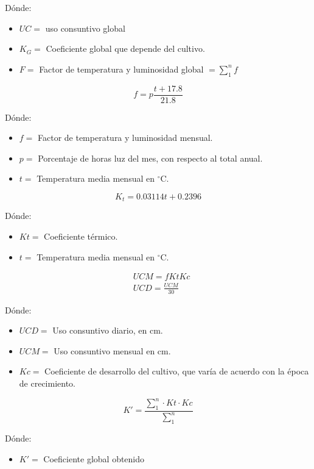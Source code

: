 Dónde:
\begin{itemize}
	\item $UC =$ uso consuntivo global
	\item $K_G =$ Coeficiente global que depende del cultivo.
	\item $F=$ Factor de temperatura y luminosidad global $=\sum_1^n f$
\end{itemize}

\begin{equation}
	f=p\frac{t+17.8}{21.8}
\end{equation}

Dónde:
\begin{itemize}
	\item $f =$ Factor de temperatura y luminosidad mensual.
	\item $p =$ Porcentaje de horas luz del mes, con respecto al total anual.
	\item $t =$ Temperatura media mensual en $^{\circ}$C.
\end{itemize}

\begin{equation}
	K_t= 0.03114 t + 0.2396
\end{equation}

Dónde:
\begin{itemize}
	\item $Kt =$ Coeficiente térmico.
	\item $t  =$ Temperatura media mensual en $^{\circ}$C.
\end{itemize}

\begin{align}
	 & UCM = f Kt Kc        \\
	 & UCD = \frac{UCM}{30}
\end{align}

Dónde:

\begin{itemize}
	\item $UCD =$ Uso consuntivo diario, en cm.
	\item $UCM =$ Uso consuntivo mensual en cm.
	\item $Kc =$ Coeficiente de desarrollo del cultivo, que varía de acuerdo con la época de
	      crecimiento.
\end{itemize}

\begin{equation}
	K'=\frac{\sum_1^n\cdot Kt\cdot Kc}{\sum_1^n}
\end{equation}

Dónde:
\begin{itemize}
	\item $K'=$ Coeficiente global obtenido
\end{itemize}

